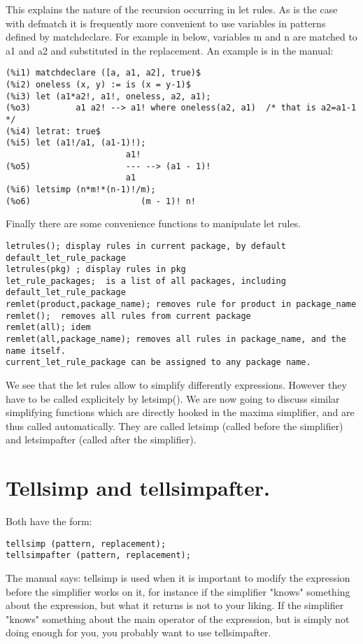\documentclass[a4paper,11pt]{article}
\begin{document}
This explains the nature of the recursion occurring in let rules. As
is the case with defmatch it is frequently more convenient to use
variables in patterns defined by matchdeclare.  For example in %
below, variables m and n are matched to a1 and a2 and substituted in
the replacement. An example is in the manual:
\begin{verbatim}
(%i1) matchdeclare ([a, a1, a2], true)$
(%i2) oneless (x, y) := is (x = y-1)$
(%i3) let (a1*a2!, a1!, oneless, a2, a1);
(%o3)         a1 a2! --> a1! where oneless(a2, a1)  /* that is a2=a1-1 */
(%i4) letrat: true$
(%i5) let (a1!/a1, (a1-1)!);
                        a1!
(%o5)                   --- --> (a1 - 1)!
                        a1
(%i6) letsimp (n*m!*(n-1)!/m);
(%o6)                      (m - 1)! n!
\end{verbatim}

Finally there are some convenience functions to manipulate let rules.
\begin{verbatim}
letrules(); display rules in current package, by default default_let_rule_package
letrules(pkg) ; display rules in pkg
let_rule_packages;  is a list of all packages, including default_let_rule_package
remlet(product,package_name); removes rule for product in package_name
remlet();  removes all rules from current package
remlet(all); idem
remlet(all,package_name); removes all rules in package_name, and the name itself.
current_let_rule_package can be assigned to any package name.
\end{verbatim}
We see that the let rules allow to simplify differently expressions. However they
have to be called explicitely by letsimp(). We are now going to discuss similar
simplifying functions which are directly hooked in the maxima simplifier, and are
thus called automatically. They are called letsimp (called before the simplifier)
and letsimpafter (called after the simplifier).


\section{Tellsimp and tellsimpafter.}


Both have the form:

\begin{verbatim}
tellsimp (pattern, replacement);
tellsimpafter (pattern, replacement);
\end{verbatim}

The manual says: tellsimp is used when it is important to modify the
expression before the simplifier works on it, for instance if the
simplifier "knows" something about the expression, but what it returns
is not to your liking. If the simplifier "knows" something about the
main operator of the expression, but is simply not doing enough for
you, you probably want to use tellsimpafter.  
\end{document}
